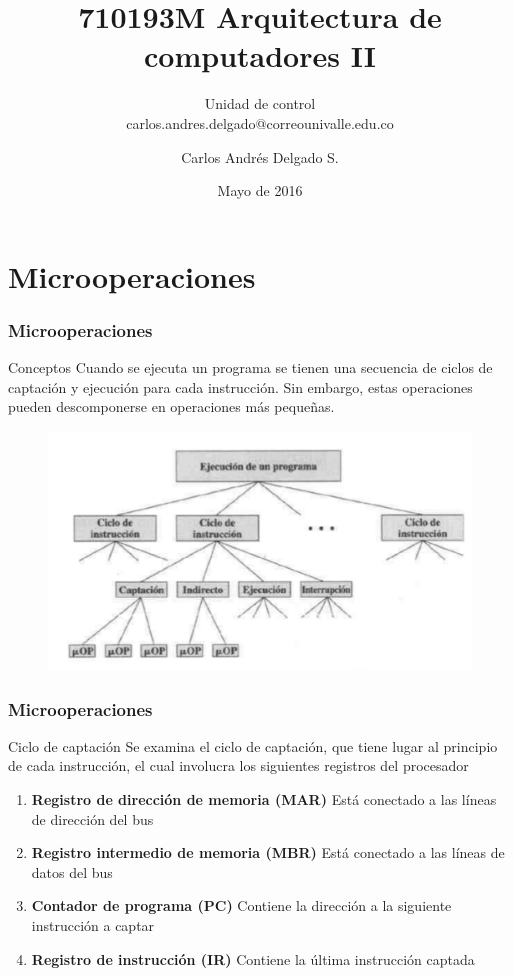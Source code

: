 \documentclass{beamer}
\author{Carlos Andr\'es Delgado S.}
\title{710193M Arquitectura de computadores II}
\subtitle{Unidad de control \\ carlos.andres.delgado@correounivalle.edu.co}
\institute{Facultad de Ingeniería. Universidad del Valle}
\date{Mayo de 2016}
\begin{document}
\begin{frame}
	\titlepage	 		
\end{frame}

\begin{frame}
	\tableofcontents	 		
\end{frame}


\section{Microoperaciones}

\begin{frame}
	\frametitle{Microoperaciones}
	\begin{block}{Conceptos}
	Cuando se ejecuta un programa se tienen una secuencia de ciclos de captación y ejecución para cada instrucción. Sin embargo, estas operaciones pueden descomponerse en operaciones más pequeñas.
	\end{block}		 		
	\begin{figure}[H]
		\centering
		\includegraphics[scale=0.4]{imagenes/programa.png} 
	\end{figure}
\end{frame}

\begin{frame}
	\frametitle{Microoperaciones}
	\begin{block}{Ciclo de captación}
	Se examina el ciclo de captación, que tiene lugar al principio de cada instrucción, el cual involucra los siguientes registros del procesador
	\begin{enumerate}
		\item \textbf{Registro de dirección de memoria (MAR)} Está conectado a las líneas de dirección del bus
		\item \textbf{Registro intermedio de memoria (MBR)} Está conectado a las líneas de datos del bus
		\item \textbf{Contador de programa (PC)} Contiene la dirección a la siguiente instrucción a captar
		\item \textbf{Registro de instrucción (IR)} Contiene la última instrucción captada
	\end{enumerate}	 
	\end{block}
\end{frame}
\end{document}
